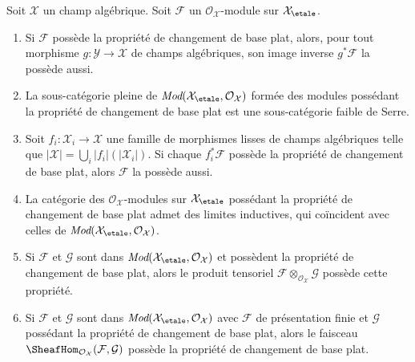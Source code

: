 \begin{lemma}
\label{lemma-check-flat-comparison-on-etale-covering}
Soit $\mathcal{X}$ un champ algébrique. Soit $\mathcal{F}$
un $\mathcal{O}_\mathcal{X}$-module sur $\mathcal{X}_\etale$.
\begin{enumerate}
\item Si $\mathcal{F}$ possède la propriété de changement de base plat, alors, pour tout morphisme
$g : \mathcal{Y} \to \mathcal{X}$ de champs algébriques, son
image inverse $g^*\mathcal{F}$ la possède aussi.
\item La sous-catégorie pleine de
$\textit{Mod}(\mathcal{X}_\etale, \mathcal{O}_\mathcal{X})$
formée des modules possédant la propriété de changement de base plat
est une sous-catégorie faible de Serre.
\item Soit $f_i : \mathcal{X}_i \to \mathcal{X}$ une famille de morphismes
lisses de champs algébriques telle que
$|\mathcal{X}| = \bigcup_i |f_i|(|\mathcal{X}_i|)$. Si chaque
$f_i^*\mathcal{F}$ possède la propriété de changement de base plat, alors
$\mathcal{F}$ la possède aussi.
\item La catégorie des $\mathcal{O}_\mathcal{X}$-modules
sur $\mathcal{X}_\etale$ possédant la propriété de changement de base plat
admet des limites inductives, qui coïncident avec celles de
$\textit{Mod}(\mathcal{X}_\etale, \mathcal{O}_\mathcal{X})$.
\item Si $\mathcal{F}$ et $\mathcal{G}$ sont dans
$\textit{Mod}(\mathcal{X}_\etale, \mathcal{O}_\mathcal{X})$
et possèdent la propriété de changement de base plat, alors le produit tensoriel
$\mathcal{F} \otimes_{\mathcal{O}_\mathcal{X}} \mathcal{G}$
possède cette propriété.
\item Si $\mathcal{F}$ et $\mathcal{G}$ sont dans
$\textit{Mod}(\mathcal{X}_\etale, \mathcal{O}_\mathcal{X})$
avec $\mathcal{F}$ de présentation finie et $\mathcal{G}$ possédant
la propriété de changement de base plat, alors le faisceau
$\SheafHom_{\mathcal{O}_\mathcal{X}}(\mathcal{F}, \mathcal{G})$
possède la propriété de changement de base plat.
\end{enumerate}
\end{lemma}

